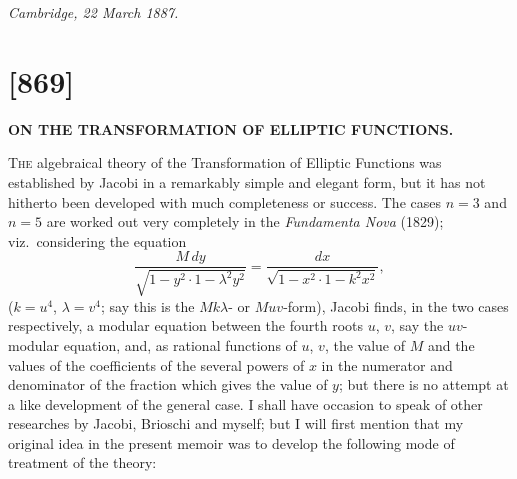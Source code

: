 \documentclass[11pt,a4paper]{book}
\begin{document}
\begin{flushright}
\textit{Cambridge, 22 March 1887.}
\end{flushright}

\newpage
\section*{[869]}
\begin{center}
\large\textbf{ON THE TRANSFORMATION OF ELLIPTIC FUNCTIONS.}
\end{center}

\begin{flushright}
\end{flushright}

\textsc{The} algebraical theory of the Transformation of Elliptic Functions was established
by Jacobi in a remarkably simple and elegant form, but it has not hitherto been
developed with much completeness or success. The cases $n = 3$ and $n = 5$ are worked
out very completely in the \textit{Fundamenta Nova} (1829); viz.\ considering the equation
\[
\frac{M\, dy}{\sqrt{1 - y^2 \cdot 1 - \lambda^2 y^2}} = \frac{dx}{\sqrt{1 - x^2 \cdot 1 - k^2 x^2}},
\]
($k = u^4$, $\lambda = v^4$; say this is the $Mk\lambda$- or $Muv$-form), Jacobi finds, in the two cases
respectively, a modular equation between the fourth roots $u$, $v$, say the $uv$-modular
equation, and, as rational functions of $u$, $v$, the value of $M$ and the values of the
coefficients of the several powers of $x$ in the numerator and denominator of the
fraction which gives the value of $y$; but there is no attempt at a like development
of the general case. I shall have occasion to speak of other researches by Jacobi,
Brioschi and myself; but I will first mention that my original idea in the present
memoir was to develop the following mode of treatment of the theory:
\end{document}
